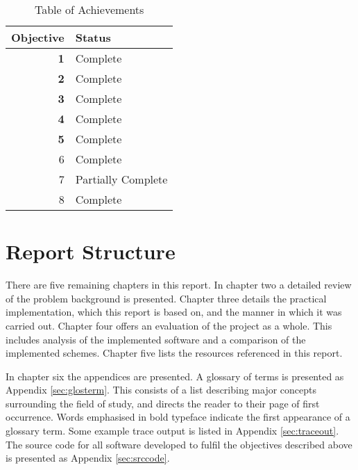 \begin{table}[H]
    \centering
    \begin{tabular}{|r|l|}
        \hline
            \textbf{Objective} & \textbf{Status} \\
        \hline \hline
            \textbf{1} & Complete \\
            \textbf{2} & Complete \\
            \textbf{3} & Complete \\
            \textbf{4} & Complete \\
            \textbf{5} & Complete \\
        \hline
            6 & Complete \\
            7 & Partially Complete \\
            8 & Complete \\
        \hline
    \end{tabular}
    \caption{Table of Achievements}
    \label{tab:ach}
\end{table}

\section*{Report Structure}

There are five remaining chapters in this report. 
In chapter two a detailed review of the problem background is presented. 
Chapter three details the practical implementation, which this report is based on, and the manner in which it was carried out.
Chapter four offers an evaluation of the project as a whole. This includes analysis of the implemented software and a comparison of the implemented
schemes.
Chapter five lists the resources referenced in this report.

In chapter six the appendices are presented.
A glossary of terms is presented as Appendix \ref{sec:glosterm}. 
This consists of a list describing major concepts surrounding the field of study, and directs the reader to their page of first occurrence. 
Words emphasised in bold typeface indicate the first appearance of a glossary term.
Some example trace output is listed in Appendix \ref{sec:traceout}.
The source code for all software developed to fulfil the objectives described above is presented as Appendix \ref{sec:srccode}.


